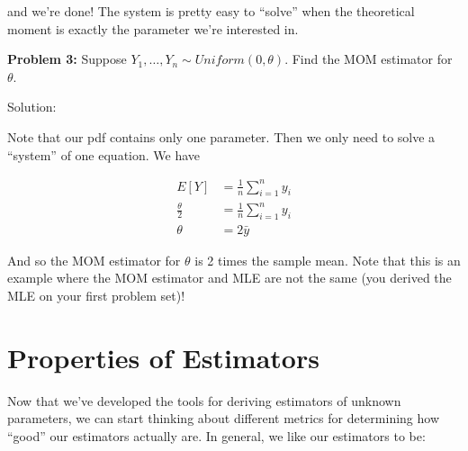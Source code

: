 \documentclass[
  letterpaper,
  DIV=11,
  numbers=noendperiod]{scrreprt}
\begin{document}
and we're done! The system is pretty easy to ``solve'' when the
theoretical moment is exactly the parameter we're interested in.

\textbf{Problem 3:} Suppose \(Y_1, \dots, Y_n \sim Uniform(0, \theta)\).
Find the MOM estimator for \(\theta\).

Solution:

Note that our pdf contains only one parameter. Then we only need to
solve a ``system'' of one equation. We have

\begin{align*}
  E[Y] & = \frac{1}{n} \sum_{i = 1}^n y_i \\
  \frac{\theta}{2} & = \frac{1}{n} \sum_{i = 1}^n y_i \\
  \theta & = 2 \bar{y}
\end{align*}

And so the MOM estimator for \(\theta\) is 2 times the sample mean. Note
that this is an example where the MOM estimator and MLE are not the same
(you derived the MLE on your first problem set)!


\chapter{Properties of Estimators}\label{properties-of-estimators}

Now that we've developed the tools for deriving estimators of unknown
parameters, we can start thinking about different metrics for
determining how ``good'' our estimators actually are. In general, we
like our estimators to be:
\end{document}
